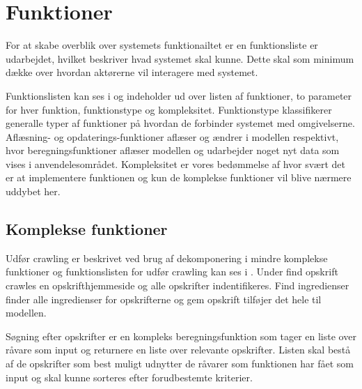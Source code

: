 \section{Funktioner}
\label{sec:funktioner}

For at skabe overblik over systemets funktionailtet er en funktionsliste er udarbejdet, hvilket beskriver hvad systemet skal kunne. Dette skal som minimum dække over hvordan aktørerne vil interagere med systemet.

Funktionslisten kan ses i  og indeholder ud over listen af funktioner, to parameter for hver funktion, funktionstype og kompleksitet. Funktionstype klassifikerer generalle typer af funktioner på hvordan de forbinder systemet med omgivelserne. Aflæsning- og opdaterings-funktioner aflæser og ændrer i modellen respektivt, hvor beregningsfunktioner aflæser modellen og udarbejder noget nyt data som vises i anvendelesområdet. Kompleksitet er vores bedømmelse af hvor svært det er at implementere funktionen og kun de komplekse funktioner vil blive nærmere uddybet her.



\subsection{Komplekse funktioner}
Udfør crawling er beskrivet ved brug af dekomponering i mindre komplekse funktioner og funktionslisten for udfør crawling kan ses i . Under find opskrift crawles en opskrifthjemmeside og alle opskrifter indentifikeres. Find ingredienser finder alle ingredienser for opskrifterne og gem opskrift tilføjer det hele til modellen.

Søgning efter opskrifter er en kompleks beregningsfunktion som tager en liste over råvare som input og returnere en liste over relevante opskrifter. Listen skal bestå af de opskrifter som best muligt udnytter de råvarer som funktionen har fået som input og skal kunne sorteres efter forudbestemte kriterier.
